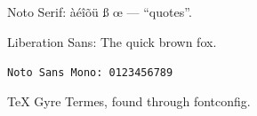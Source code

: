 \documentclass{article}
\begin{document}
Noto Serif: àéîõü ß œ — “quotes”.

\textsf{Liberation Sans: The quick brown fox.}

\texttt{Noto Sans Mono: 0123456789}

{\gyre TeX Gyre Termes, found through fontconfig.}
\end{document}
